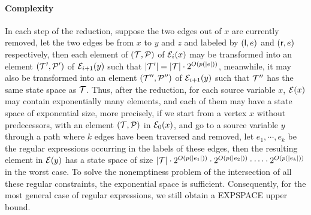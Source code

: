 \paragraph*{Complexity}
In each step of the reduction, suppose the two edges out of $x$ are currently removed, let the two edges be from $x$ to $y$ and $z$ and labeled by $({\sf l}, e)$ and $({\sf r}, e)$ respectively, then each element of $(\mathcal{T}, \mathcal{P})$ of $\mathcal{E}_i(x)$ may be transformed into an element $(\mathcal{T}',\mathcal{P}')$ of $\mathcal{E}_{i+1}(y)$ such that $|\mathcal{T}'| = |\mathcal{T}| \cdot 2^{O(p(|e|))}$, meanwhile, it may also be transformed into an element $(\mathcal{T}'',\mathcal{P}'')$ of $\mathcal{E}_{i+1}(y)$ such that $\mathcal{T}''$ has the same state space as $\mathcal{T}$. Thus, after the reduction, for each source variable $x$, $\mathcal{E}(x)$ may contain exponentially many elements, and each of them may have a state space of exponential size, more precisely, if we start from a vertex $x$ without predecessors, with an element $(\mathcal{T},\mathcal{P})$ in $\mathcal{E}_0(x)$, and go to a source variable $y$ through a path where $k$ edges have been traversed and removed, let $e_1,\cdots, e_k$ be the regular expressions occurring in the labels of these edges, then the resulting element in $\mathcal{E}(y)$ has a state space of size $|\mathcal{T}| \cdot 2^{O(p(|e_1|))} \cdot 2^{O(p(|e_2|))} \cdot \cdots \cdot 2^{O(p(|e_k|))}$ in the worst case. To solve the nonemptiness problem of the intersection of all these regular constraints, the exponential space is sufficient. Consequently, for the most general case of regular expressions, we still obtain a EXPSPACE upper bound. 

